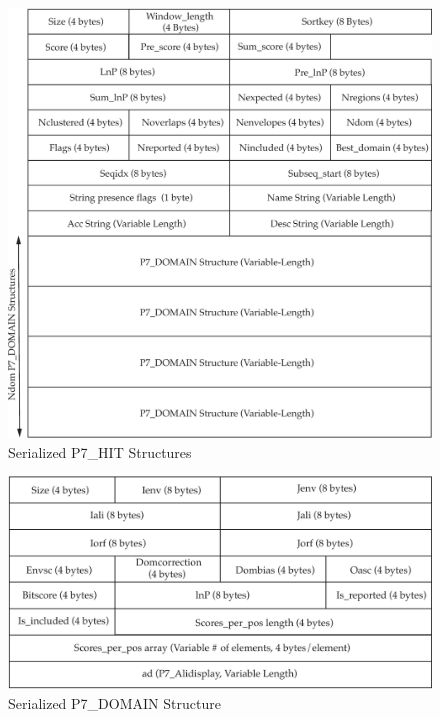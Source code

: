 \documentclass[notoc,justified]{tufte-book}    %
\begin{document}
{\begin{figure}
\includegraphics[width=\textwidth]{inclusions/hit-serialize.pdf}
\caption{Serialized {P7\_HIT} Structures}
\label{fig:hit-serialize}
\end{figure}
\begin{figure}
\includegraphics[width=\textwidth]{inclusions/domain-serialize.pdf}
\caption{Serialized {P7\_DOMAIN} Structure}
\label{fig:domain-serialize}
\end{figure}
\begin{figure}

\end{figure}}
\end{document}
